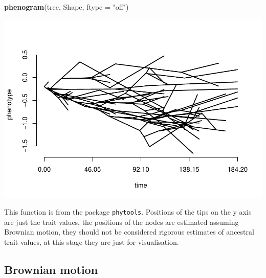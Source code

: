 \documentclass[]{article}
\newenvironment{Shaded}{\begin{snugshade}}{\end{snugshade}}
\newcommand{\KeywordTok}[1]{\textcolor[rgb]{0.13,0.29,0.53}{\textbf{#1}}}
\newcommand{\DataTypeTok}[1]{\textcolor[rgb]{0.13,0.29,0.53}{#1}}
\newcommand{\StringTok}[1]{\textcolor[rgb]{0.31,0.60,0.02}{#1}}
\newcommand{\NormalTok}[1]{#1}
\begin{document}
\begin{Shaded}
\begin{Highlighting}[]
\KeywordTok{phenogram}\NormalTok{(tree, Shape, }\DataTypeTok{ftype =} \StringTok{"off"}\NormalTok{) }
\end{Highlighting}
\end{Shaded}

\includegraphics{module_08_files/figure-latex/unnamed-chunk-15-2.pdf}

This function is from the package \texttt{phytools}. Positions of the
tips on the y axis are just the trait values, the positions of the nodes
are estimated assuming Brownian motion, they should not be considered
rigorous estimates of ancestral trait values, at this stage they are
just for visualisation.

\subsection{Brownian motion}\label{brownian-motion}
\end{document}

